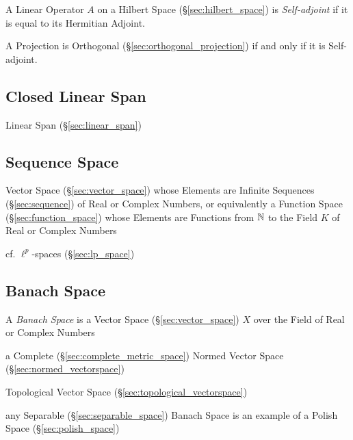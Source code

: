 A Linear Operator $A$ on a Hilbert Space (\S\ref{sec:hilbert_space}) is
\emph{Self-adjoint} if it is equal to its Hermitian Adjoint.

A Projection is Orthogonal (\S\ref{sec:orthogonal_projection}) if and only if
it is Self-adjoint.



\subsection{Closed Linear Span}\label{sec:closed_linear_span}

Linear Span (\S\ref{sec:linear_span})



\subsection{Sequence Space}\label{sec:sequence_space}

Vector Space (\S\ref{sec:vector_space}) whose Elements are Infinite Sequences
(\S\ref{sec:sequence}) of Real or Complex Numbers, or equivalently a Function
Space (\S\ref{sec:function_space}) whose Elements are Functions from $\mathbb{N}$ to
the Field $K$ of Real or Complex Numbers

\fist cf. $\ell^p$-spaces (\S\ref{sec:lp_space})



\subsection{Banach Space}\label{sec:banach_space}

A \emph{Banach Space} is a Vector Space (\S\ref{sec:vector_space}) $X$ over the
Field of Real or Complex Numbers

a Complete (\S\ref{sec:complete_metric_space}) Normed Vector Space
(\S\ref{sec:normed_vectorspace})

Topological Vector Space (\S\ref{sec:topological_vectorspace})

any Separable (\S\ref{sec:separable_space}) Banach Space is an example of a
Polish Space (\S\ref{sec:polish_space})

